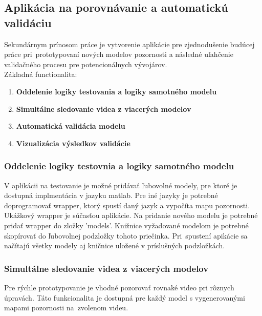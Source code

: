 \subsection{Aplikácia na porovnávanie a automatickú validáciu}
Sekundárnym prínosom práce je vytvorenie aplikácie pre zjednodušenie budúcej práce pri~prototypovaní nových modelov pozornosti a následné uľahčenie validačného procesu pre potencionálnych vývojárov.\\
Základná functionalita:
\begin{enumerate}
  \item\textbf{Oddelenie logiky testovania a logiky samotného modelu}
  \item\textbf{Simultálne sledovanie videa z viacerých modelov}
  \item\textbf{Automatická validácia modelu}
  \item\textbf{Vizualizácia výsledkov validácie}
\end{enumerate}

\subsubsection{Oddelenie logiky testovnia a logiky samotného modelu}
V aplikácii na testovanie je možné pridávať ľubovolné modely, pre ktoré je dostupná implmentácia v jazyku matlab.
Pre iné jazyky je potrebné doprogramovať wrapper, ktorý spustí daný jazyk a vypočíta mapu pozornosti.
Ukážkový wrapper je súčasťou aplikácie.
Na pridanie nového modelu je potrebné pridať wrapper do zložky 'models'.
Knižnice vyžadované modelom je potrebné skopírovať do ľubovolnej podzložky tohoto priečinka.
Pri~spustení apikácie sa načítajú všetky modely aj kničnice uložené v príslušných podzložkách.

\subsubsection{Simultálne sledovanie videa z viacerých modelov}
Pre rýchle prototypovanie je vhodné pozorovať rovnaké video pri rôznych úpravách.
Táto funkcionalita je dostupná pre každý model s vygenerovanými mapami pozornosti na~zvolenom videu.

